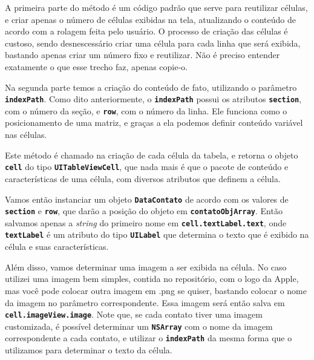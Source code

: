 \documentclass[a4paper,12pt,brazil,oneside]{book}
\begin{document}
A primeira parte do método é um código padrão que serve para reutilizar células, e criar apenas o número de células exibidas na tela, atualizando o conteúdo de acordo com a rolagem feita pelo usuário. O processo de criação das células é custoso, sendo desnescessário criar uma célula para cada linha que será exibida, bastando apenas criar um número fixo e reutilizar. Não é preciso entender exatamente o que esse trecho faz, apenas copie-o.

Na segunda parte temos a criação do conteúdo de fato, utilizando o parâmetro \texttt{\textbf{indexPath}}. Como dito anteriormente, o \texttt{\textbf{indexPath}} possui os atributos \texttt{\textbf{section}}, com o número da seção, e \texttt{\textbf{row}}, com o número da linha. Ele funciona como o posicionamento de uma matriz, e graças a ela podemos definir conteúdo variável nas células.

Este método é chamado na criação de cada célula da tabela, e retorna o objeto \texttt{\textbf{cell}} do tipo \texttt{\textbf{UITableViewCell}}, que nada mais é que o pacote de conteúdo e características de uma célula, com diversos atributos que definem a célula.

Vamos então instanciar um objeto \texttt{\textbf{DataContato}} de acordo com os valores de \texttt{\textbf{section}} e \texttt{\textbf{row}}, que darão a posição do objeto em \texttt{\textbf{contatoObjArray}}. Então salvamos apenas a \emph{string} do primeiro nome em \texttt{\textbf{cell.textLabel.text}}, onde \texttt{\textbf{textLabel}} é um atributo do tipo \texttt{\textbf{UILabel}} que determina o texto que é exibido na célula e suas características.

Além disso, vamos determinar uma imagem a ser exibida na célula. No caso utilizei uma imagem bem simples, contida no repositório, com o logo da Apple, mas você pode colocar outra imagem em .png se quiser, bastando colocar o nome da imagem no parâmetro correspondente. Essa imagem será então salva em \texttt{\textbf{cell.imageView.image}}. Note que, se cada contato tiver uma imagem customizada, é possível determinar um \texttt{\textbf{NSArray}} com o nome da imagem correspondente a cada contato, e utilizar o \texttt{\textbf{indexPath}} da mesma forma que o utilizamos para determinar o texto da célula.
\end{document}
